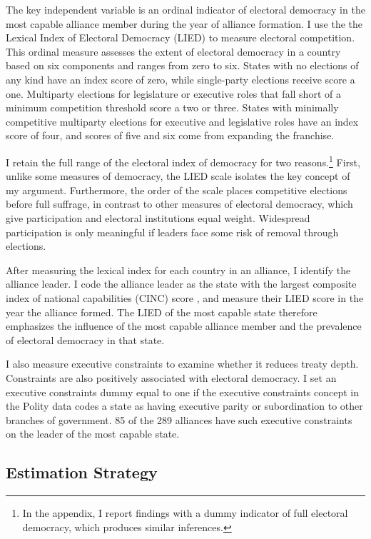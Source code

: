 \documentclass[12pt]{article}
\begin{document}
The key independent variable is an ordinal indicator of electoral democracy in the most capable alliance member during the year of alliance formation. 
I use the the Lexical Index of Electoral Democracy (LIED) \citep{Skaaningetal2015} to measure electoral competition.
This ordinal measure assesses the extent of electoral democracy in a country based on six components and ranges from zero to six.  
States with no elections of any kind have an index score of zero, while single-party elections receive score a one. 
Multiparty elections for legislature or executive roles that fall short of a minimum competition threshold score a two or three. 
States with minimally competitive multiparty elections for executive and legislative roles have an index score of four, and scores of five and six come from expanding the franchise.

I retain the full range of the electoral index of democracy for two reasons.\footnote{In the appendix, I report findings with a dummy indicator of full electoral democracy, which produces similar inferences.}
First, unlike some measures of democracy, the LIED scale isolates the key concept of my argument.
Furthermore, the order of the scale places competitive elections before full suffrage, in contrast to other measures of electoral democracy, which give participation and electoral institutions equal weight. 
Widespread participation is only meaningful if leaders face some risk of removal through elections.


After measuring the lexical index for each country in an alliance, I identify the alliance leader.   
I code the alliance leader as the state with the largest composite index of national capabilities (CINC) score \citep{SingerCINC1988}, and measure their LIED score in the year the alliance formed.
The LIED of the most capable state therefore emphasizes the influence of the most capable alliance member and the prevalence of electoral democracy in that state.


I also measure executive constraints to examine whether it reduces treaty depth. 
Constraints are also positively associated with electoral democracy.
I set an executive constraints dummy equal to one if the executive constraints concept in the Polity data codes a state as having executive parity or subordination to other branches of government.
85 of the 289 alliances have such executive constraints on the leader of the most capable state.



\subsection{Estimation Strategy}
\end{document}
